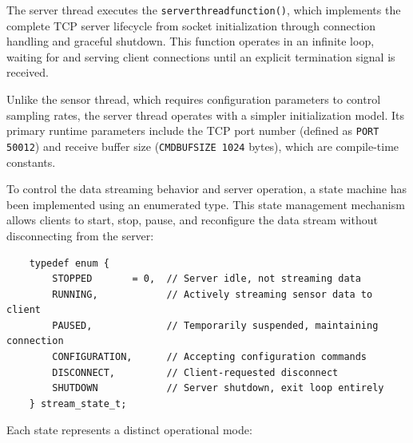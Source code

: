 The server thread executes the \texttt{serverthreadfunction()}, which implements the complete TCP server lifecycle from socket initialization through connection handling and graceful shutdown. This function operates in an infinite loop, waiting for and serving client connections until an explicit termination signal is received.

Unlike the sensor thread, which requires configuration parameters to control sampling rates, the server thread operates with a simpler initialization model. Its primary runtime parameters include the TCP port number (defined as \texttt{PORT 50012}) and receive buffer size (\texttt{CMDBUFSIZE 1024} bytes), which are compile-time constants.

To control the data streaming behavior and server operation, a state machine has been implemented using an enumerated type. This state management mechanism allows clients to start, stop, pause, and reconfigure the data stream without disconnecting from the server:

\begin{verbatim}
	typedef enum {
		STOPPED       = 0,  // Server idle, not streaming data
		RUNNING,            // Actively streaming sensor data to client
		PAUSED,             // Temporarily suspended, maintaining connection
		CONFIGURATION,      // Accepting configuration commands
		DISCONNECT,         // Client-requested disconnect
		SHUTDOWN            // Server shutdown, exit loop entirely
	} stream_state_t;
\end{verbatim}

Each state represents a distinct operational mode:

